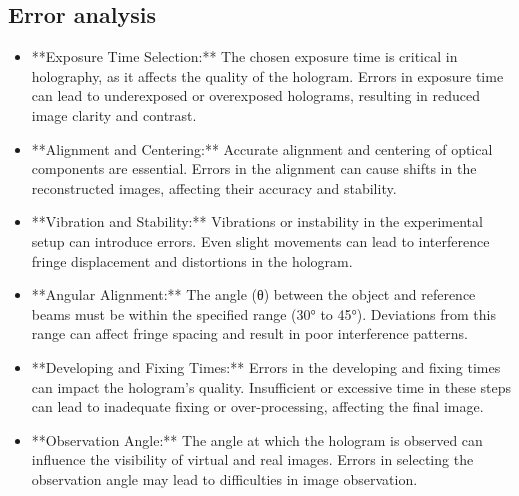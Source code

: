 \documentclass[UTF8]{article}
\begin{document}
\subsection{Error analysis}
\begin{itemize}
  \item **Exposure Time Selection:** The chosen exposure time is critical in holography, as it affects the quality of the hologram. Errors in exposure time can lead to underexposed or overexposed holograms, resulting in reduced image clarity and contrast.

  \item **Alignment and Centering:** Accurate alignment and centering of optical components are essential. Errors in the alignment can cause shifts in the reconstructed images, affecting their accuracy and stability.

  \item **Vibration and Stability:** Vibrations or instability in the experimental setup can introduce errors. Even slight movements can lead to interference fringe displacement and distortions in the hologram.

  \item **Angular Alignment:** The angle (θ) between the object and reference beams must be within the specified range (30° to 45°). Deviations from this range can affect fringe spacing and result in poor interference patterns.

  \item **Developing and Fixing Times:** Errors in the developing and fixing times can impact the hologram's quality. Insufficient or excessive time in these steps can lead to inadequate fixing or over-processing, affecting the final image.

  \item **Observation Angle:** The angle at which the hologram is observed can influence the visibility of virtual and real images. Errors in selecting the observation angle may lead to difficulties in image observation.
\end{itemize}
\end{document}
